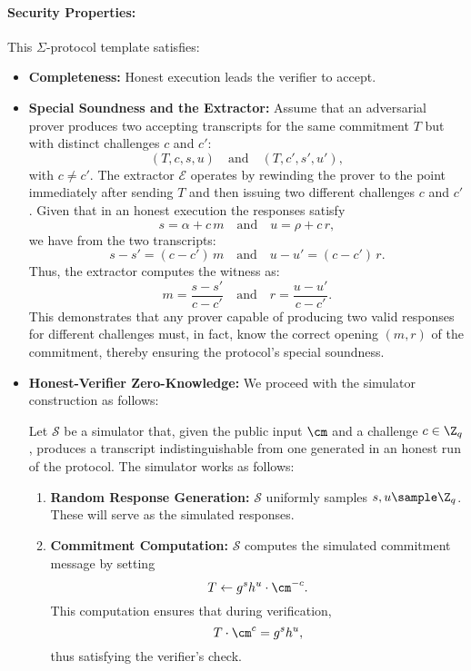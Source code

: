 \paragraph{Security Properties:}
This \(\Sigma\)-protocol template satisfies:
\begin{itemize}
    \item \textbf{Completeness:} Honest execution leads the verifier to accept.
    
    \item \textbf{Special Soundness and the Extractor:}      Assume that an adversarial prover produces two accepting transcripts for the same commitment \(T\) but with distinct challenges \(c\) and \(c'\):
    \[
    (T, c, s, u) \quad \text{and} \quad (T, c', s', u'),
    \]
    with \(c \neq c'\). The extractor \(\mathcal{E}\) operates by rewinding the prover to the point immediately after sending \(T\) and then issuing two different challenges \(c\) and \(c'\). Given that in an honest execution the responses satisfy
    \[
    s = \alpha + c\,m \quad \text{and} \quad u = \rho + c\,r,
    \]
    we have from the two transcripts:
    \[
    s - s' = (c - c')\,m \quad \text{and} \quad u - u' = (c - c')\,r.
    \]
    Thus, the extractor computes the witness as:
    \[
    m = \frac{s - s'}{c - c'} \quad \text{and} \quad r = \frac{u - u'}{c - c'}.
    \]
    This demonstrates that any prover capable of producing two valid responses for different challenges must, in fact, know the correct opening \((m, r)\) of the commitment, thereby ensuring the protocol’s special soundness.


    
    \item \textbf{Honest-Verifier Zero-Knowledge:} We proceed with the simulator construction as follows:

    Let $\mathcal{S}$ be a simulator that, given the public input \(\cm\) and a challenge \(c \in \Z_q\), produces a transcript indistinguishable from one generated in an honest run of the protocol. The simulator works as follows:
    \begin{enumerate}
        \item \textbf{Random Response Generation:}  
        \(\mathcal{S}\) uniformly samples \(s, u \sample \Z_q\). These will serve as the simulated responses.
        
        \item \textbf{Commitment Computation:}  
        \(\mathcal{S}\) computes the simulated commitment message by setting
        \[
            T \gets g^s h^u \cdot \cm^{-c}.
        \]
        This computation ensures that during verification,
        \[
            T \cdot \cm^c = g^s h^u,
        \]
        thus satisfying the verifier’s check.
        

\end{enumerate}
\end{itemize}
